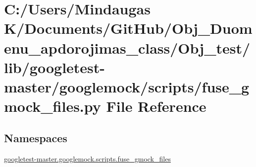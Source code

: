 \hypertarget{_obj__test_2lib_2googletest-master_2googlemock_2scripts_2fuse__gmock__files_8py}{}\section{C\+:/\+Users/\+Mindaugas K/\+Documents/\+Git\+Hub/\+Obj\+\_\+\+Duomenu\+\_\+apdorojimas\+\_\+class/\+Obj\+\_\+test/lib/googletest-\/master/googlemock/scripts/fuse\+\_\+gmock\+\_\+files.py File Reference}
\label{_obj__test_2lib_2googletest-master_2googlemock_2scripts_2fuse__gmock__files_8py}
\subsection*{Namespaces}
\begin{DoxyCompactItemize}
\item 
 \mbox{\hyperlink{namespacegoogletest-master_1_1googlemock_1_1scripts_1_1fuse__gmock__files}{googletest-\/master.\+googlemock.\+scripts.\+fuse\+\_\+gmock\+\_\+files}}
\end{DoxyCompactItemize}
